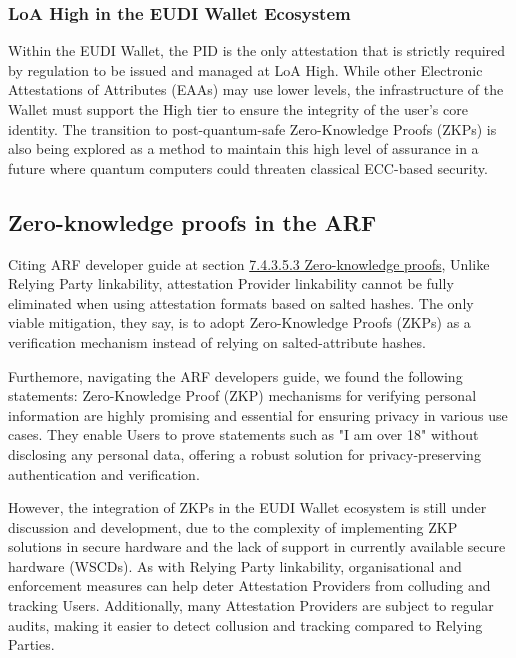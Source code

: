 \documentclass{article}
\begin{document}
\subsubsection{LoA High in the EUDI Wallet Ecosystem}
Within the EUDI Wallet, the PID is the only attestation that is strictly required by regulation to be issued and managed at LoA High. While other Electronic Attestations of Attributes (EAAs) may use lower levels, the infrastructure of the Wallet must support the High tier to ensure the integrity of the user's core identity. The transition to post-quantum-safe Zero-Knowledge Proofs (ZKPs) is also being explored as a method to maintain this high level of assurance in a future where quantum computers could threaten classical ECC-based security.

\subsection{Zero-knowledge proofs in the ARF}
\label{eudi:zkp}
Citing ARF developer guide at section \href{https://eudi.dev/latest/architecture-and-reference-framework-main/#74353-zero-knowledge-proofs}{7.4.3.5.3 Zero-knowledge proofs},
Unlike Relying Party linkability, attestation Provider linkability cannot be fully eliminated when using attestation formats based on salted hashes. The only viable mitigation, they say,
is to adopt Zero-Knowledge Proofs (ZKPs) as a verification mechanism instead of relying on salted-attribute hashes.

Furthemore, navigating the ARF developers guide, we found the following statements:
Zero-Knowledge Proof (ZKP) mechanisms for verifying personal information are highly promising and essential for ensuring privacy in various use cases. They enable Users to prove 
statements such as "I am over 18" without disclosing any personal data, offering a robust solution for privacy-preserving authentication and verification.

However, the integration of ZKPs in the EUDI Wallet ecosystem is still under discussion and development, due to the complexity of implementing ZKP solutions in secure hardware and the 
lack of support in currently available secure hardware (WSCDs). As with Relying Party linkability, organisational and enforcement measures can help deter Attestation Providers from 
colluding and tracking Users. Additionally, many Attestation Providers are subject to regular audits, making it easier to detect collusion and tracking compared to Relying Parties.

\end{document}

